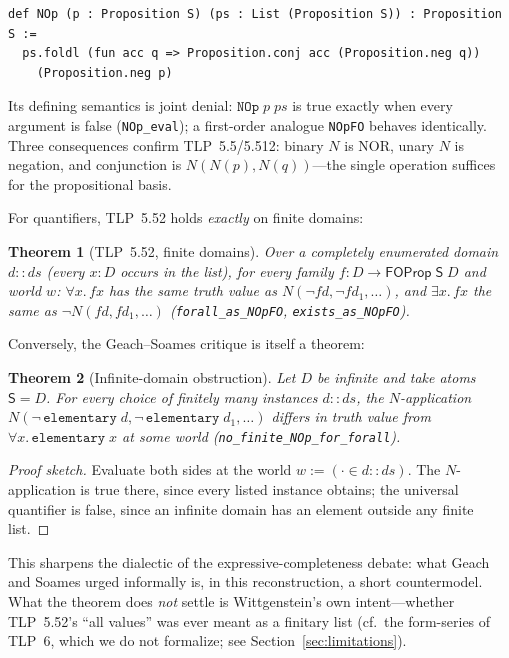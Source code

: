 \documentclass[10pt, letterpaper]{article}
\newtheorem{theorem}{Theorem}[section]
\theoremstyle{definition}
\theoremstyle{remark}
\newcommand{\Sach}{\mathsf{S}}
\begin{document}
\begin{lstlisting}
def NOp (p : Proposition S) (ps : List (Proposition S)) : Proposition S :=
  ps.foldl (fun acc q => Proposition.conj acc (Proposition.neg q))
    (Proposition.neg p)
\end{lstlisting}

\noindent
Its defining semantics is joint denial: $\mathtt{NOp}\;p\;ps$ is
true exactly when every argument is false (\texttt{NOp\_eval});
a first-order analogue \texttt{NOpFO} behaves identically.
Three consequences confirm TLP~5.5/5.512: binary $N$ is NOR,
unary $N$ is negation, and conjunction is $N(N(p), N(q))$---the
single operation suffices for the propositional basis.

For quantifiers, TLP~5.52 holds \emph{exactly} on finite
domains:

\begin{theorem}[TLP~5.52, finite domains]
\label{thm:tlp552}
Over a completely enumerated domain $d :: ds$ (every $x : D$
occurs in the list), for every family
$f : D \to \mathsf{FOProp}\;\Sach\;D$ and world $w$:
$\forall x.\,f x$ has the same truth value as
$N(\lnot f d, \lnot f d_1, \ldots)$, and $\exists x.\,f x$ the
same as $\lnot N(f d, f d_1, \ldots)$
(\texttt{forall\_as\_NOpFO}, \texttt{exists\_as\_NOpFO}).
\end{theorem}

\noindent
Conversely, the Geach--Soames critique is itself a theorem:

\begin{theorem}[Infinite-domain obstruction]
\label{thm:geach-soames}
Let $D$ be infinite and take atoms $\Sach = D$.  For every
choice of finitely many instances $d :: ds$, the $N$-application
$N(\lnot\,\mathtt{elementary}\;d, \lnot\,\mathtt{elementary}\;d_1,
\ldots)$ differs in truth value from
$\forall x.\,\mathtt{elementary}\;x$ at some world
(\texttt{no\_finite\_NOp\_for\_forall}).
\end{theorem}

\begin{proof}[Proof sketch]
Evaluate both sides at the world $w := (\cdot \in d :: ds)$.
The $N$-application is true there, since every listed instance
obtains; the universal quantifier is false, since an infinite
domain has an element outside any finite list.
\end{proof}

\noindent
This sharpens the dialectic of the expressive-completeness
debate: what Geach and Soames urged informally is, in this
reconstruction, a short countermodel.  What the theorem does
\emph{not} settle is Wittgenstein's own intent---whether
TLP~5.52's ``all values'' was ever meant as a finitary list
(cf.\ the form-series of TLP~6, which we do not formalize; see
Section~\ref{sec:limitations}).
\end{document}
